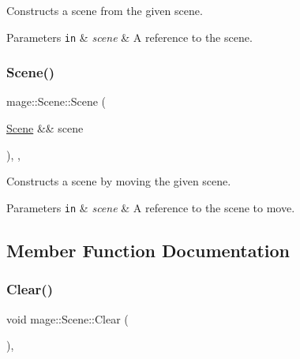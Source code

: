 Constructs a scene from the given scene.


\begin{DoxyParams}[1]{Parameters}
\mbox{\tt in}  & {\em scene} & A reference to the scene. \\
\hline
\end{DoxyParams}
\hypertarget{classmage_1_1_scene_afeae10a3a50bf1d624faa6bd0bf33a7d}{}\label{classmage_1_1_scene_afeae10a3a50bf1d624faa6bd0bf33a7d} 
\subsubsection{\texorpdfstring{Scene()}{Scene()}\hspace{0.1cm}{\footnotesize\ttfamily [3/3]}}
{\footnotesize\ttfamily mage\+::\+Scene\+::\+Scene (\begin{DoxyParamCaption}\item[{\hyperlink{classmage_1_1_scene}{Scene} \&\&}]{scene }\end{DoxyParamCaption})\hspace{0.3cm}{\ttfamily [protected]}, {\ttfamily [default]}, {\ttfamily [noexcept]}}

Constructs a scene by moving the given scene.


\begin{DoxyParams}[1]{Parameters}
\mbox{\tt in}  & {\em scene} & A reference to the scene to move. \\
\hline
\end{DoxyParams}


\subsection{Member Function Documentation}
\hypertarget{classmage_1_1_scene_adf4a5b3885e34336caa5f145f55e01e1}{}\label{classmage_1_1_scene_adf4a5b3885e34336caa5f145f55e01e1} 
\subsubsection{\texorpdfstring{Clear()}{Clear()}}
{\footnotesize\ttfamily void mage\+::\+Scene\+::\+Clear (\begin{DoxyParamCaption}{ }\end{DoxyParamCaption})\hspace{0.3cm}{\ttfamily [private]}, {\ttfamily [noexcept]}}

